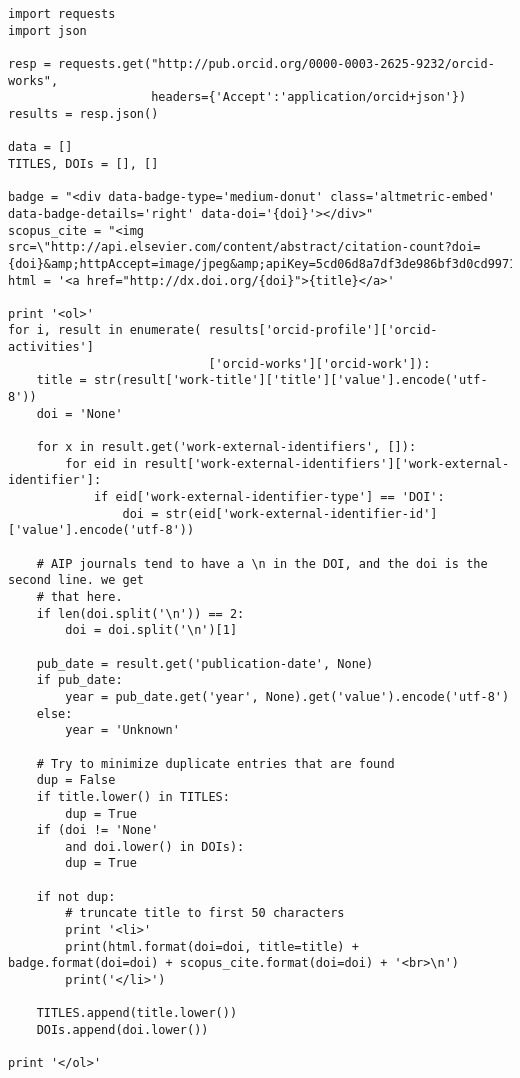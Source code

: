 \documentclass[11pt]{article}
\begin{document}
\begin{verbatim}
import requests
import json

resp = requests.get("http://pub.orcid.org/0000-0003-2625-9232/orcid-works",
                    headers={'Accept':'application/orcid+json'})
results = resp.json()

data = []
TITLES, DOIs = [], []

badge = "<div data-badge-type='medium-donut' class='altmetric-embed' data-badge-details='right' data-doi='{doi}'></div>"
scopus_cite = "<img src=\"http://api.elsevier.com/content/abstract/citation-count?doi={doi}&amp;httpAccept=image/jpeg&amp;apiKey=5cd06d8a7df3de986bf3d0cd9971a47c\">"
html = '<a href="http://dx.doi.org/{doi}">{title}</a>'

print '<ol>'
for i, result in enumerate( results['orcid-profile']['orcid-activities']
                            ['orcid-works']['orcid-work']):
    title = str(result['work-title']['title']['value'].encode('utf-8'))
    doi = 'None'

    for x in result.get('work-external-identifiers', []):
        for eid in result['work-external-identifiers']['work-external-identifier']:
            if eid['work-external-identifier-type'] == 'DOI':
                doi = str(eid['work-external-identifier-id']['value'].encode('utf-8'))

    # AIP journals tend to have a \n in the DOI, and the doi is the second line. we get
    # that here.
    if len(doi.split('\n')) == 2:
        doi = doi.split('\n')[1]

    pub_date = result.get('publication-date', None)
    if pub_date:
        year = pub_date.get('year', None).get('value').encode('utf-8')
    else:
        year = 'Unknown'

    # Try to minimize duplicate entries that are found
    dup = False
    if title.lower() in TITLES:
        dup = True
    if (doi != 'None'
        and doi.lower() in DOIs):
        dup = True

    if not dup:
        # truncate title to first 50 characters
        print '<li>'
        print(html.format(doi=doi, title=title) + badge.format(doi=doi) + scopus_cite.format(doi=doi) + '<br>\n')
        print('</li>')

    TITLES.append(title.lower())
    DOIs.append(doi.lower())

print '</ol>'
\end{verbatim}
\end{document}
